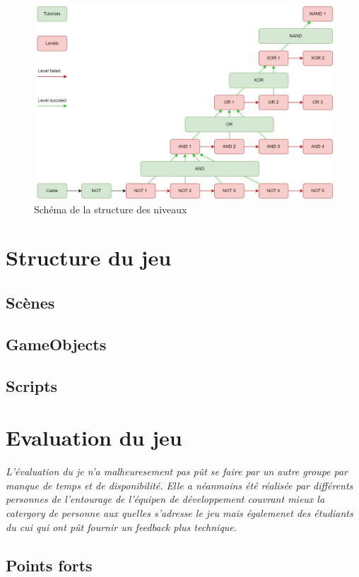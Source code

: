 \documentclass{article}
\begin{document}
\begin{figure}[h]
    \centering
    \includegraphics[width=\textwidth]{img/Levels Tree.jpg}
    \caption{Schéma de la structure des niveaux}
\end{figure}

\section{Structure du jeu}
    \subsection{Scènes}

    \subsection{GameObjects}    
    \subsection{Scripts}

\section{Evaluation du jeu}
\textit{L'évaluation du je n'a malheuresement pas pût se faire par un autre groupe par manque de temps et de disponibilité. Elle a néanmoins été réalisée par différents personnes de l'entourage de l'équipen de développement couvrant mieux la catergory de personne aux quelles s'adresse le jeu mais égalemenet des étudiants du cui qui ont pût fournir un feedback plus technique.}\\
	\subsection{Points forts}
\end{document}
